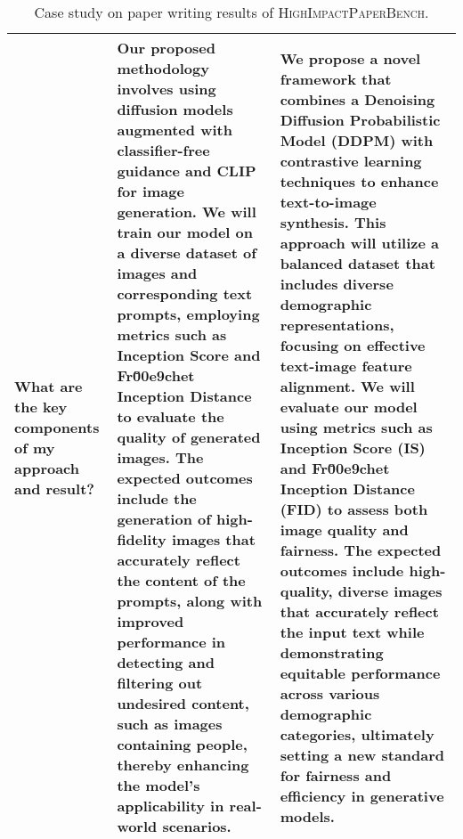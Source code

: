 \begin{table*}[htbp]
\begin{tabular}{p{3cm}p{6cm}p{6cm}}
What are the key components of my approach and result? & 
Our proposed methodology involves using diffusion models augmented with classifier-free guidance and CLIP for image generation. We will train our model on a diverse dataset of images and corresponding text prompts, employing metrics such as Inception Score and Fr\u00e9chet Inception Distance to evaluate the quality of generated images. The expected outcomes include the generation of high-fidelity images that accurately reflect the content of the prompts, along with improved performance in detecting and filtering out undesired content, such as images containing people, thereby enhancing the model's applicability in real-world scenarios. &
We propose a novel framework that combines a Denoising Diffusion Probabilistic Model (DDPM) with contrastive learning techniques to enhance text-to-image synthesis. This approach will utilize a balanced dataset that includes diverse demographic representations, focusing on effective text-image feature alignment. We will evaluate our model using metrics such as Inception Score (IS) and Fr\u00e9chet Inception Distance (FID) to assess both image quality and fairness. The expected outcomes include high-quality, diverse images that accurately reflect the input text while demonstrating equitable performance across various demographic categories, ultimately setting a new standard for fairness and efficiency in generative models.
\\
\bottomrule[1.1pt]
\end{tabular}
\caption{Case study on paper writing results of \textsc{HighImpactPaperBench}.}
\label{tab:oodbench}
\end{table*}

